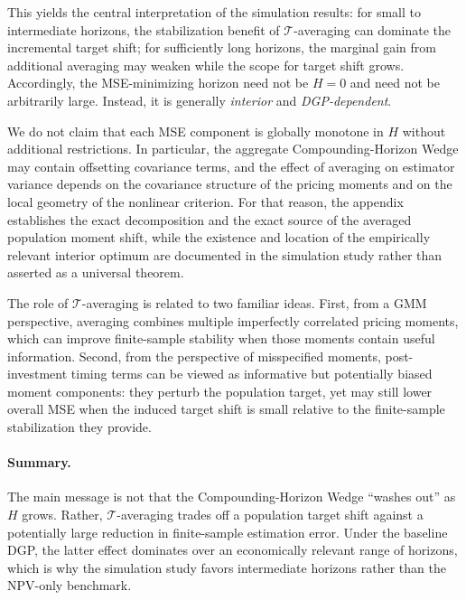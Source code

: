 This yields the central interpretation of the simulation results:
for small to intermediate horizons, the stabilization benefit of $\mathcal{T}$-averaging can dominate the incremental target shift;
for sufficiently long horizons, the marginal gain from additional averaging may weaken while the scope for target shift grows.
Accordingly, the MSE-minimizing horizon need not be $H=0$ and need not be arbitrarily large.
Instead, it is generally \emph{interior} and \emph{DGP-dependent}.

\begin{remark}
	We do not claim that each MSE component is globally monotone in $H$ without additional restrictions.
	In particular, the aggregate Compounding-Horizon Wedge may contain offsetting covariance terms, and the effect of averaging on estimator variance depends on the covariance structure of the pricing moments and on the local geometry of the nonlinear criterion.
	For that reason, the appendix establishes the exact decomposition and the exact source of the averaged population moment shift, while the existence and location of the empirically relevant interior optimum are documented in the simulation study rather than asserted as a universal theorem.
\end{remark}

\begin{remark}
	The role of $\mathcal{T}$-averaging is related to two familiar ideas.
	First, from a GMM perspective, averaging combines multiple imperfectly correlated pricing moments, which can improve finite-sample stability when those moments contain useful information.
	Second, from the perspective of misspecified moments, post-investment timing terms can be viewed as informative but potentially biased moment components: they perturb the population target, yet may still lower overall MSE when the induced target shift is small relative to the finite-sample stabilization they provide.
\end{remark}

\paragraph{Summary.}
The main message is not that the Compounding-Horizon Wedge ``washes out'' as $H$ grows.
Rather, $\mathcal{T}$-averaging trades off a population target shift against a potentially large reduction in finite-sample estimation error.
Under the baseline DGP, the latter effect dominates over an economically relevant range of horizons, which is why the simulation study favors intermediate horizons rather than the NPV-only benchmark.






